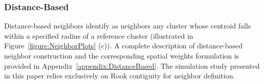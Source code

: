 \documentclass{article}[11pt]
\providecommand{\DIFdelend}{} %
\DeclareRobustCommand{\DIFdelend}{\DIFOaddend \let\includegraphics\DIFOincludegraphics} %
\begin{document}




\DIFdelend \subsubsection{Distance-Based}

Distance-based neighbors\cite{fotheringham_sage_2009} identify as neighbors any cluster whose centroid falls within a specified radius of a reference cluster (illustrated in Figure~\ref{figure:NeighborPlots} (c)). A complete description of distance-based neighbor construction and the corresponding spatial weights formulation is provided in Appendix~\ref{appendix:DistanceBased}. The simulation study presented in this paper relies exclusively on Rook contiguity for neighbor definition.
\end{document}
